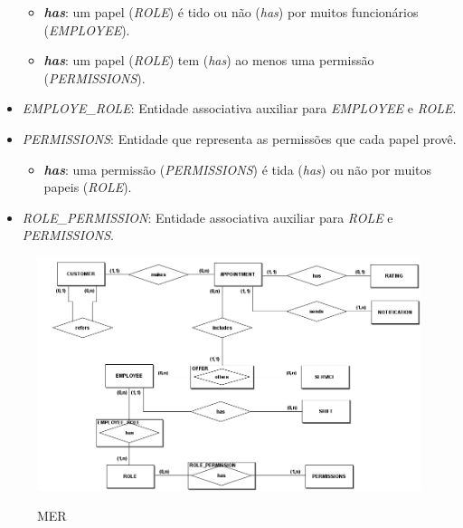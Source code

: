 \begin{itemize}
\begin{itemize}
		\item \textbf{\textit{has}}: um papel (\emph{ROLE}) é tido ou não (\textit{has}) por muitos funcionários (\emph{EMPLOYEE}).
		\item \textbf{\textit{has}}: um papel (\emph{ROLE}) tem (\textit{has}) ao menos uma permissão (\emph{PERMISSIONS}).
	\end{itemize}
	\item \emph{EMPLOYE\_ROLE}: Entidade associativa auxiliar para \emph{EMPLOYEE} e \emph{ROLE}.
	\item \emph{PERMISSIONS}: Entidade que representa as permissões que cada papel provê.
	\begin{itemize}
		\item \textbf{\textit{has}}: uma permissão (\emph{PERMISSIONS}) é tida (\textit{has}) ou não por muitos papeis (\emph{ROLE}).
\end{itemize}
	\item \emph{ROLE\_PERMISSION}: Entidade associativa auxiliar para \emph{ROLE} e \emph{PERMISSIONS}.
\end{itemize}
\begin{figure}[h!tbp]
	\centering
	\caption{MER}
	\includegraphics[width=1\textwidth]{cap04-desenvolvimento/images/4-7-1-modelo-entidade-relacionamento.png}
	\label{fig:mer}
\end{figure}
